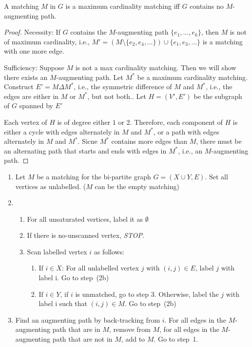 \begin{theorem}[Berge]
A matching $M$ in $G$ is a maximum cardinality matching iff $G$ contains no $M$-augmenting path.
\end{theorem}
\begin{proof}
Necessity:
If $G$ contains the $M$-augmenting path $\{e_1,\dots,e_k\}$, then $M$ is not of maximum cardinality, i.e., $M'=(M\setminus\{e_2,e_4,\dots\})\cup\{e_1,e_3,\dots\}$ is a matching with one more edge.

Sufficiency:
Suppose $M$ is not a max cardinality matching. Then we will show there exists an $M$-augmenting path.
Let $M^*$ be a maximum cardinality matching. Construct $E'=M\Delta M^*$, i.e., the symmetric difference of $M$ and $M^*$, i.e., the edges are either in $M$ or $M^*$, but not both..
Let $H=(V',E')$ be the subgraph of $G$ spanned by $E'$

Each vertex of $H$ is of degree either $1$ or $2$. Therefore, each component of $H$ is either a cycle with edges alternately in $M$ and $M^*$, or a path with edges alternately in $M$ and $M^*$.
Sicne $M^*$ contains more edges than $M$, there must be an alternating path that starts and ends with edges in $M^*$, i.e., an $M$-augmenting path.

\end{proof}

\begin{enumerate}
\item
Let $M$ be a matching for the bi-partite graph $G=(X\cup Y,E)$.
Set all vertices as unlabelled. ($M$ can be the empty matching)
\item
\begin{enumerate}
\item
For all unsaturated vertices, label it as $\emptyset$
\item
If there is no-unscanned vertex, \emph{STOP}.
\item
Scan labelled vertex $i$ as follows:
\begin{enumerate}
\item
If $i\in X$: For all unlabelled vertex $j$ with $(i,j)\in E$, label $j$ with label {i}. Go to step~(2b)
\item
If $i\in Y$, if $i$ is unmatched, go to step 3. Otherwise, label the $j$ with label {i} such that $(i,j)\in M$. 
Go to step~(2b)
\end{enumerate}
\end{enumerate}
\item
Find an augmenting path by back-tracking from $i$.
For all edges in the $M$-augmenting path that are in $M$, remove from $M$, for all edges in the $M$-augmenting path that are not in $M$, add to $M$.
Go to step~1.
\end{enumerate}

